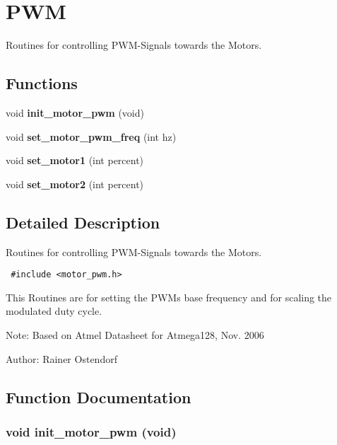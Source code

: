 \section{PWM}
\label{group__Motor}
Routines for controlling PWM-Signals towards the Motors.  
\subsection*{Functions}
\begin{CompactItemize}
\item 
void {\bf init\_\-motor\_\-pwm} (void)
\item 
void {\bf set\_\-motor\_\-pwm\_\-freq} (int hz)
\item 
void {\bf set\_\-motor1} (int percent)
\item 
void {\bf set\_\-motor2} (int percent)
\end{CompactItemize}


\subsection{Detailed Description}
Routines for controlling PWM-Signals towards the Motors. 



\begin{Code}\begin{verbatim} #include <motor_pwm.h> 
\end{verbatim}\end{Code}



This Routines are for setting the PWMs base frequency and for scaling the modulated duty cycle.

\begin{Desc}
\item[Note:]Based on Atmel Datasheet for Atmega128, Nov. 2006 \end{Desc}
\begin{Desc}
\item[Author:]Rainer Ostendorf \end{Desc}


\subsection{Function Documentation}
\subsubsection{\setlength{\rightskip}{0pt plus 5cm}void init\_\-motor\_\-pwm (void)}\label{group__Motor_g37644f1449a77dae22f6b6eefaae6899}


